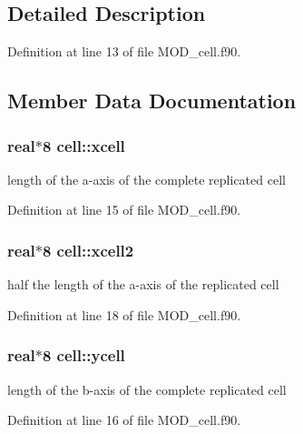 \subsection{Detailed Description}


Definition at line 13 of file M\-O\-D\-\_\-cell.\-f90.



\subsection{Member Data Documentation}
\hypertarget{classcell_a695c86493edeb02d8cc35f9a33b33124}{
\subsubsection[{xcell}]{\setlength{\rightskip}{0pt plus 5cm}real$\ast$8 cell\-::xcell}}\label{classcell_a695c86493edeb02d8cc35f9a33b33124}


length of the a-\/axis of the complete replicated cell 



Definition at line 15 of file M\-O\-D\-\_\-cell.\-f90.

\hypertarget{classcell_ae3226a3f8ee2919d369164e281e77ca5}{
\subsubsection[{xcell2}]{\setlength{\rightskip}{0pt plus 5cm}real$\ast$8 cell\-::xcell2}}\label{classcell_ae3226a3f8ee2919d369164e281e77ca5}


half the length of the a-\/axis of the replicated cell 



Definition at line 18 of file M\-O\-D\-\_\-cell.\-f90.

\hypertarget{classcell_a373e688332561e88d2268dceac0f21c8}{
\subsubsection[{ycell}]{\setlength{\rightskip}{0pt plus 5cm}real$\ast$8 cell\-::ycell}}\label{classcell_a373e688332561e88d2268dceac0f21c8}


length of the b-\/axis of the complete replicated cell 



Definition at line 16 of file M\-O\-D\-\_\-cell.\-f90.

